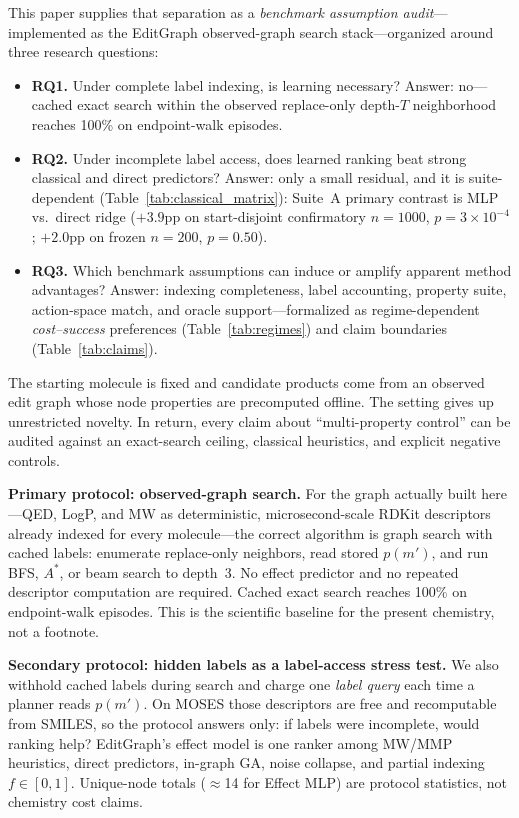 This paper supplies that separation as a \emph{benchmark assumption audit}---implemented as the EditGraph observed-graph search stack---organized around three research questions:
\begin{itemize}
  \item \textbf{RQ1.} Under complete label indexing, is learning necessary?
  Answer: no---cached exact search within the observed replace-only depth-$T$ neighborhood reaches 100\% on endpoint-walk episodes.
  \item \textbf{RQ2.} Under incomplete label access, does learned ranking beat strong classical and direct predictors?
  Answer: only a small residual, and it is suite-dependent (Table~\ref{tab:classical_matrix}): Suite~A primary contrast is MLP vs.\ direct ridge ($+3.9$pp on start-disjoint confirmatory $n{=}1000$, $p{=}3\times10^{-4}$; $+2.0$pp on frozen $n{=}200$, $p{=}0.50$).
  \item \textbf{RQ3.} Which benchmark assumptions can induce or amplify apparent method advantages?
  Answer: indexing completeness, label accounting, property suite, action-space match, and oracle support---formalized as regime-dependent \emph{cost--success} preferences (Table~\ref{tab:regimes}) and claim boundaries (Table~\ref{tab:claims}).
\end{itemize}

The starting molecule is fixed and candidate products come from an observed edit graph whose node properties are precomputed offline. The setting gives up unrestricted novelty. In return, every claim about ``multi-property control'' can be audited against an exact-search ceiling, classical heuristics, and explicit negative controls.

\textbf{Primary protocol: observed-graph search.} For the graph actually built here---QED, LogP, and MW as deterministic, microsecond-scale RDKit descriptors already indexed for every molecule---the correct algorithm is graph search with cached labels: enumerate replace-only neighbors, read stored $p(m')$, and run BFS, $A^\ast$, or beam search to depth~3. No effect predictor and no repeated descriptor computation are required. Cached exact search reaches 100\% on endpoint-walk episodes. This is the scientific baseline for the present chemistry, not a footnote.

\textbf{Secondary protocol: hidden labels as a label-access stress test.} We also withhold cached labels during search and charge one \emph{label query} each time a planner reads $p(m')$. On MOSES those descriptors are free and recomputable from SMILES, so the protocol answers only: if labels were incomplete, would ranking help? EditGraph's effect model is one ranker among MW/MMP heuristics, direct predictors, in-graph GA, noise collapse, and partial indexing $f{\in}[0,1]$. Unique-node totals ($\approx$14 for Effect MLP) are protocol statistics, not chemistry cost claims.

